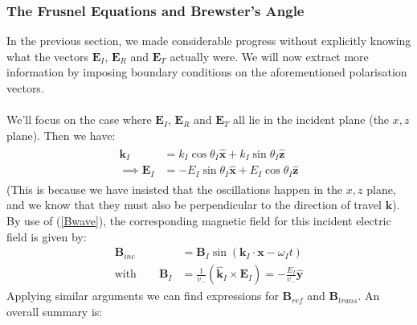 \documentclass[a4paper]{article}
\numberwithin{equation}{section}
\begin{document}
\subsubsection{The Frusnel Equations and Brewster's Angle}
In the previous section, we made considerable progress without explicitly knowing what the vectors $\mathbf{E}_I$, $\mathbf{E}_R$ and $\mathbf{E}_T$ actually were. We will now extract more information by imposing boundary conditions on the aforementioned polarisation vectors.\\
\\
We'll focus on the case where $\mathbf{E}_I$, $\mathbf{E}_R$ and $\mathbf{E}_T$ all lie in the incident plane (the $x,z$ plane). Then we have:
\begin{align}
\begin{split}
\mathbf{k}_I &= k_I \cos \theta_I \hat{\mathbf{x}} + k_I \sin \theta_I \hat{\mathbf{z}} \\
\implies \mathbf{E}_I &= -E_I \sin \theta_I \hat{\mathbf{x}} + E_I \cos \theta_I \hat{\mathbf{z}}
\end{split}
\end{align}
(This is because we have insisted that the oscillations happen in the $x,z$ plane, and we know that they must also be perpendicular to the direction of travel $\mathbf{k}$). By use of (\ref{Bwave}), the corresponding magnetic field for this incident electric field is given by:
\begin{align}
\mathbf{B}_{inc} &= \mathbf{B}_I \sin(\mathbf{k}_I \cdot \mathbf{x}- \omega_I t) \\
\text{with} \qquad \mathbf{B}_I &= \frac{1}{v_-} (\hat{\mathbf{k}}_I \times \mathbf{E}_I) = -\frac{E_I}{v_-}\hat{\mathbf{y}}
\end{align}
Applying similar arguments we can find expressions for $\mathbf{B}_{ref}$ and $\mathbf{B}_{trans}$. An overall summary is:
\end{document}

